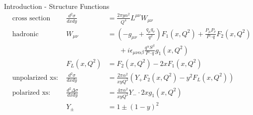 \begin{frame}{Introduction - Structure Functions}
\begin{align}
&\text{cross section (xs):}&\frac{d^2\sigma}{dx dy} &= \frac{2\pi y \alpha^2}{Q^4} L^{\mu\nu} W_{\mu\nu}\\
&\text{hadronic tensor:}&W_{\mu\nu} &= \left(-g_{\mu\nu} + \frac{q_\mu q_\nu}{q^2}\right) F_1(x,Q^2) + \frac{P_\mu P_\nu}{P\cdot q} F_2(x,Q^2) \nonumber\\
&& & \hspace{20pt} + i \epsilon_{\mu\nu\alpha\beta} \frac{q^{\alpha}S^{\beta}}{P\cdot q} g_1(x,Q^2)\\
&&F_L(x,Q^2) &= F_2(x,Q^2) - 2xF_1(x,Q^2)\\
&\text{unpolarized xs:}&\frac{d^2\sigma}{dx dy} &= \frac{2\pi \alpha^2}{x y Q^2}\left(Y_+F_2(x,Q^2) - y^2F_L(x,Q^2)\right)\\
&\text{polarized xs:}&\frac{d^2\Delta\sigma}{dx dy} &= \frac{4\pi \alpha^2}{x y Q^2}Y_-\cdot 2xg_1(x,Q^2)\\
&&Y_\pm &= 1 \pm (1-y)^2
\end{align}
\end{frame}
